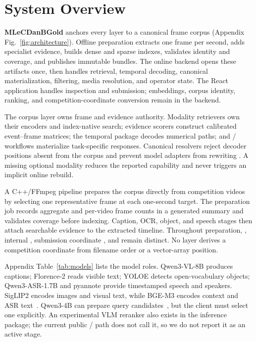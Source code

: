 
\section{System Overview}

\textbf{MLeCDanBGold} anchors every layer to a canonical frame corpus
(Appendix Fig.~\ref{fig:architecture}). Offline preparation extracts one frame per
second, adds specialist evidence, builds dense and sparse indexes, validates
identity and coverage, and publishes immutable bundles. The online backend opens
these artifacts once, then handles retrieval, temporal decoding, canonical
materialization, filtering, media resolution, and operator state. The React
application handles inspection and submission; embeddings, corpus identity,
ranking, and competition-coordinate conversion remain in the backend.

The corpus layer owns frame and evidence authority. Modality retrievers own their
encoders and index-native search; evidence scorers construct calibrated
event--frame matrices; the temporal package decodes numerical paths; and
\KIS/\TRAKE{} workflows materialize task-specific responses. Canonical resolvers
reject decoder positions absent from the corpus and prevent model adapters from
rewriting . A missing optional modality reduces the reported
capability and never triggers an implicit online rebuild.

A C++/FFmpeg pipeline prepares the corpus directly from competition videos by
selecting one representative frame at each one-second target. The preparation job
records aggregate and per-video frame counts in a generated summary and validates
coverage before indexing. Caption, OCR, object, and speech stages then attach
searchable evidence to the extracted timeline. Throughout preparation,
, internal , submission coordinate
, and  remain distinct. No layer derives a
competition coordinate from filename order or a vector-array position.

Appendix Table~\ref{tab:models} lists the model roles. Qwen3-VL-8B produces
captions; Florence-2 reads visible text; YOLOE detects open-vocabulary objects;
Qwen3-ASR-1.7B and pyannote provide timestamped speech and speakers. SigLIP2
encodes images and visual text, while BGE-M3 encodes context and ASR
text~\cite{qwen3vlcard,florence2,yoloe,qwen3asrcard,pyannote,siglip2,bgem3}.
Qwen3-4B can prepare query candidates~\cite{qwen34bcard}, but the client must
select one explicitly. An experimental VLM reranker also exists in the inference
package; the current public \KIS/\TRAKE{} path does not call it, so we do not
report it as an active stage.

